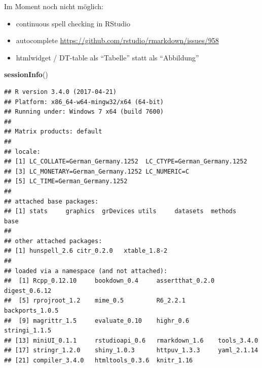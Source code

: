 \documentclass[]{book}
\makeatletter
\newenvironment{Shaded}{\begin{snugshade}}{\end{snugshade}}
\newcommand{\KeywordTok}[1]{\textcolor[rgb]{0.13,0.29,0.53}{\textbf{{#1}}}}
\newcommand{\CommentTok}[1]{\textcolor[rgb]{0.56,0.35,0.01}{\textit{{#1}}}}
\newcommand{\NormalTok}[1]{{#1}}
\providecommand{\tightlist}{%
  \setlength{\itemsep}{0pt}\setlength{\parskip}{0pt}}
\newenvironment{kframe}{%
\medskip{}
\setlength{\fboxsep}{.8em}
 \def\at@end@of@kframe{}%
 \ifinner\ifhmode%
  \def\at@end@of@kframe{\end{minipage}}%
  \begin{minipage}{\columnwidth}%
 \fi\fi%
 \def\FrameCommand##1{\hskip\@totalleftmargin \hskip-\fboxsep
 \colorbox{shadecolor}{##1}\hskip-\fboxsep
     \hskip-\linewidth \hskip-\@totalleftmargin \hskip\columnwidth}%
 \MakeFramed {\advance\hsize-\width
   \@totalleftmargin\z@ \linewidth\hsize
   \@setminipage}}%
 {\par\unskip\endMakeFramed%
 \at@end@of@kframe}
\renewenvironment{Shaded}{\begin{kframe}}{\end{kframe}}
\theoremstyle{definition}
\theoremstyle{definition}
\theoremstyle{remark}
\makeatother
\begin{document}
Im Moment noch nicht möglich:

\begin{itemize}
\tightlist
\item
  continuous spell checking in RStudio
\item
  autocomplete \citet{ref}
  \url{https://github.com/rstudio/rmarkdown/issues/958}
\item
  htmlwidget / DT-table als ``Tabelle'' statt als ``Abbildung''
\end{itemize}

\begin{Shaded}
\begin{Highlighting}[]
\KeywordTok{sessionInfo}\NormalTok{()}
\end{Highlighting}
\end{Shaded}

\begin{verbatim}
## R version 3.4.0 (2017-04-21)
## Platform: x86_64-w64-mingw32/x64 (64-bit)
## Running under: Windows 7 x64 (build 7600)
## 
## Matrix products: default
## 
## locale:
## [1] LC_COLLATE=German_Germany.1252  LC_CTYPE=German_Germany.1252   
## [3] LC_MONETARY=German_Germany.1252 LC_NUMERIC=C                   
## [5] LC_TIME=German_Germany.1252    
## 
## attached base packages:
## [1] stats     graphics  grDevices utils     datasets  methods   base     
## 
## other attached packages:
## [1] hunspell_2.6 citr_0.2.0   xtable_1.8-2
## 
## loaded via a namespace (and not attached):
##  [1] Rcpp_0.12.10     bookdown_0.4     assertthat_0.2.0 digest_0.6.12   
##  [5] rprojroot_1.2    mime_0.5         R6_2.2.1         backports_1.0.5 
##  [9] magrittr_1.5     evaluate_0.10    highr_0.6        stringi_1.1.5   
## [13] miniUI_0.1.1     rstudioapi_0.6   rmarkdown_1.6    tools_3.4.0     
## [17] stringr_1.2.0    shiny_1.0.3      httpuv_1.3.3     yaml_2.1.14     
## [21] compiler_3.4.0   htmltools_0.3.6  knitr_1.16
\end{verbatim}

\begin{Shaded}
\end{Shaded}


\end{document}
